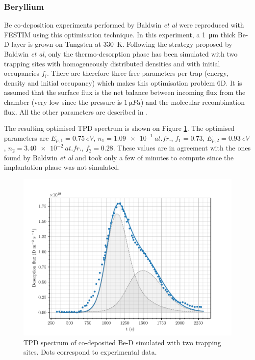 \subsubsection{Beryllium}
Be co-deposition experiments performed by Baldwin \textit{et al}  were reproduced with FESTIM using this optimisation technique.
In this experiment, a \SI{1}{\micro m} thick Be-D layer is grown on Tungsten at \SI{330}{K}. 
Following the strategy proposed by Baldwin \textit{et al}, only the thermo-desorption phase has been simulated with two trapping sites with homogeneously distributed densities and with initial occupancies $f_i$.
There are therefore three free parameters per trap (energy, density and initial occupancy) which makes this optimisation problem 6D.
It is assumed that the surface flux is the net balance between incoming flux from the chamber (very low since the pressure is $\SI{1}{\micro Pa}$) and the molecular recombination flux.
All the other parameters are described in \cite{baldwin_experimental_2014}.

The resulting optimised TPD spectrum is shown on Figure \ref{fig:tpd baldwin}.
The optimised parameters are $E_{p, 1} = \SI{0.75}{eV}$, $n_1 = \SI{1.09e-1}{at.fr.}$, $f_1=0.73$, $E_{p, 2} = \SI{0.93}{eV}$, \newline ${n_2 = \SI{3.40e-2}{at.fr.}}$, $f_2=0.28$.
These values are in agreement with the ones found by Baldwin \textit{et al} \cite{baldwin_experimental_2014} and took only a few of minutes to compute since the implantation phase was not simulated.

\begin{figure}
    \centering
    \includegraphics[width=\linewidth]{Figures/Chapter3/Parametric_optimisation/baldwin_be.pdf}
    \caption{TPD spectrum of co-deposited Be-D \cite{baldwin_experimental_2014} simulated with two trapping sites. Dots correspond to experimental data.}
    \label{fig:tpd baldwin}
\end{figure}

